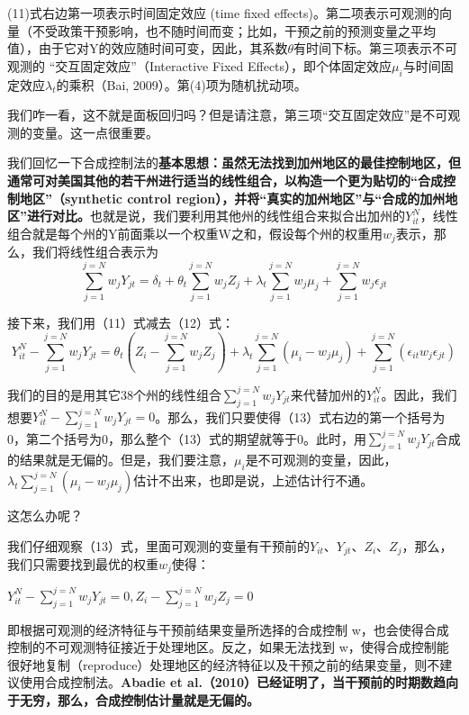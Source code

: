 \documentclass[cn,12pt,math=newtx,citestyle=gb7714-2015,bibstyle=gb7714-2015]{elegantbook}
\begin{document}
	(11)式右边第一项表示时间固定效应 (time fixed effects)。第二项表示可观测的向量（不受政策干预影响，也不随时间而变；比如，干预之前的预测变量之平均值），由于它对Y的效应随时间可变，因此，其系数$\theta$有时间下标。第三项表示不可观测的 “交互固定效应”（Interactive Fixed Effects），即个体固定效应$\mu_i$与时间固定效应$\lambda_t$的乘积（Bai, 2009）。第(4)项为随机扰动项。
	
	我们咋一看，这不就是面板回归吗？但是请注意，第三项“交互固定效应”是不可观测的变量。这一点很重要。
	
	我们回忆一下合成控制法的\textbf{基本思想：虽然无法找到加州地区的最佳控制地区，但通常可对美国其他的若干州进行适当的线性组合，以构造一个更为贴切的“合成控制地区”（synthetic control region），并将“真实的加州地区”与“合成的加州地区”进行对比。}也就是说，我们要利用其他州的线性组合来拟合出加州的$Y_{it}^N$，线性组合就是每个州的Y前面乘以一个权重W之和，假设每个州的权重用$w_j$表示，那么，我们将线性组合表示为
	\begin{equation}
		\sum_{j=1}^{j=N}w_jY_{jt}=\delta_t+\theta_t\sum_{j=1}^{j=N}w_jZ_j+\lambda_t\sum_{j=1}^{j=N}w_j\mu_j+\sum_{j=1}^{j=N}w_j\epsilon_{jt}
	\end{equation}
	
	接下来，我们用（11）式减去（12）式：
	\begin{equation}
		Y_{it}^N-\sum_{j=1}^{j=N}w_jY_{jt}=\theta_t(Z_i-\sum_{j=1}^{j=N}w_jZ_j)+\lambda_t\sum_{j=1}^{j=N}(\mu_i-w_j\mu_j)+\sum_{j=1}^{j=N}(\epsilon_{it}w_j\epsilon_{jt})
	\end{equation}
	
	我们的目的是用其它38个州的线性组合$\sum_{j=1}^{j=N}w_jY_{jt}$来代替加州的$Y_{it}^N$。因此，我们想要$Y_{it}^N-\sum_{j=1}^{j=N}w_jY_{jt}=0$。那么，我们只要使得（13）式右边的第一个括号为0，第二个括号为0，那么整个（13）式的期望就等于0。此时，用$\sum_{j=1}^{j=N}w_jY_{jt}$合成的结果就是无偏的。但是，我们要注意，$\mu_i$是不可观测的变量，因此，$\lambda_t\sum_{j=1}^{j=N}(\mu_i-w_j\mu_j)$估计不出来，也即是说，上述估计行不通。
	
	这怎么办呢？
	
	我们仔细观察（13）式，里面可观测的变量有干预前的$Y_{it}$、$Y_{jt}$、$Z_i$、$Z_j$，那么，我们只需要找到最优的权重$w_j$使得：
	\begin{center}
		$Y_{it}^N-\sum_{j=1}^{j=N}w_jY_{jt}=0,Z_i-\sum_{j=1}^{j=N}w_jZ_j=0$
	\end{center}
	
	即根据可观测的经济特征与干预前结果变量所选择的合成控制 w，也会使得合成控制的不可观测特征接近于处理地区。反之，如果无法找到 w，使得合成控制能很好地复制（reproduce）处理地区的经济特征以及干预之前的结果变量，则不建议使用合成控制法。\textbf{Abadie et al.（2010）已经证明了，当干预前的时期数趋向于无穷，那么，合成控制估计量就是无偏的。}
	
\end{document}

